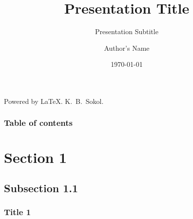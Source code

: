 \documentclass[aspectratio=169]{beamer}
\begin{document}
\title{Presentation Title}
\subtitle{Presentation Subtitle}
\author{Author's Name}
\date{\today}

{
\begin{frame}[plain]
  \begin{minipage}{0.48\paperwidth}
    \vspace*{8.5cm}\hspace*{0.6cm}\tiny Powered by \LaTeX. K.\ B.\ Sokol.%
  \end{minipage}%
  \begin{minipage}{0.42\paperwidth}
    \vspace*{3.1cm}\titlepage%
  \end{minipage}
\end{frame}
}


\begin{frame}[plain]
  \frametitle{Table of contents}
  \tableofcontents
\end{frame}


\section{Section 1} 
  \subsection{Subsection 1.1}
  \begin{frame}[foot]
    \frametitle{Title 1} 
    \lipsum[1]~\cite{articleExample}
  \end{frame}
\end{document}
